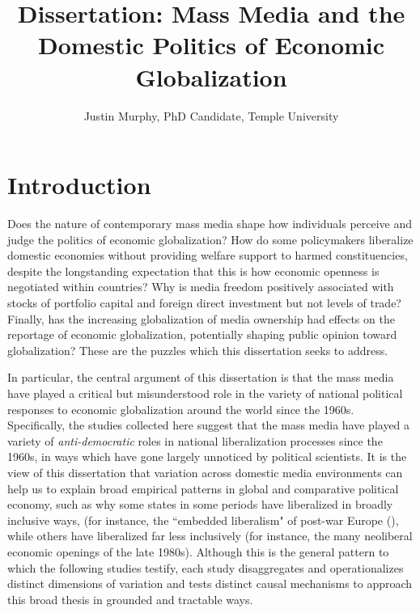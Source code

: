 \documentclass[12pt]{report}
\begin{document}
\title{Dissertation: Mass Media and the Domestic Politics of Economic Globalization}
\author{Justin Murphy, PhD Candidate, Temple University}



\maketitle



\doublespacing

\chapter{Introduction}

Does the nature of contemporary mass media shape how individuals perceive and judge the politics of economic globalization? How do some policymakers liberalize domestic economies without providing welfare support to harmed constituencies, despite the longstanding expectation that this is how economic openness is negotiated within countries? Why is media freedom positively associated with stocks of portfolio capital and foreign direct investment but not levels of trade? Finally, has the increasing globalization of media ownership had effects on the reportage of economic globalization, potentially shaping public opinion toward globalization? These are the puzzles which this dissertation seeks to address.

In particular, the central argument of this dissertation is that the mass media have played a critical but
misunderstood role in the variety of national political responses to economic globalization around
the world since the 1960s. Specifically, the studies collected here suggest that the mass media have
played a variety of \emph{anti-democratic} roles in national liberalization processes since the
1960s, in ways which have gone largely unnoticed by political scientists. It is the view of this
dissertation that variation across domestic media environments can help us to explain broad
empirical patterns in global and comparative political economy, such as why some states in some
periods have liberalized in broadly inclusive ways, (for instance, the ``embedded liberalism" of
post-war Europe (\citealt{Ruggie:1982wx}), while others have liberalized far less inclusively (for
instance, the many neoliberal economic openings of the late 1980s). Although this is the general
pattern to which the following studies testify, each study disaggregates and operationalizes
distinct dimensions of variation and tests distinct causal mechanisms to approach this broad thesis
in grounded and tractable ways.
\end{document}
